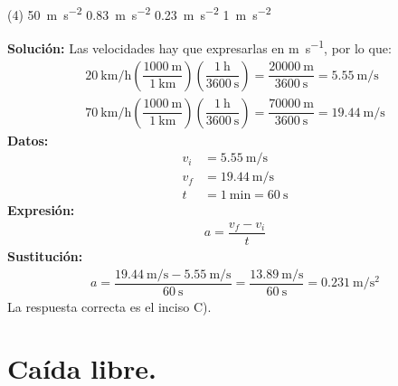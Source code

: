\documentclass[12pt, letter]{exam}
\begin{document}
\begin{questions}
    \begin{tasks}(4)
        \task \SI{50}{\meter\per\square\second}
        \task \SI{0.83}{\meter\per\square\second}
        \task \SI{0.23}{\meter\per\square\second}
        \task \SI{1}{\meter\per\square\second}
    \end{tasks}
    \textbf{Solución:} Las velocidades hay que expresarlas en \unit{\meter\per\second}, por lo que:
    \begin{align*}
    \SI[per-mode=fraction]{20}{\kilo\meter\per\hour} \left( \dfrac{\SI{1000}{\meter}}{\SI{1}{\kilo\meter}} \right) \left( \dfrac{\SI{1}{\hour}}{\SI{3600}{\second}} \right) = \dfrac{\SI{20000}{\meter}}{\SI{3600}{\second}} = \SI[per-mode=fraction]{5.55}{\meter\per\second} \\[0.5em]
    \SI[per-mode=fraction]{70}{\kilo\meter\per\hour} \left( \dfrac{\SI{1000}{\meter}}{\SI{1}{\kilo\meter}} \right) \left( \dfrac{\SI{1}{\hour}}{\SI{3600}{\second}} \right) = \dfrac{\SI{70000}{\meter}}{\SI{3600}{\second}} = \SI[per-mode=fraction]{19.44}{\meter\per\second}
    \end{align*}
    \textbf{Datos:}
    \begin{align*}
    v_{i} &= \SI[per-mode=fraction]{5.55}{\meter\per\second} \\[0.5em]
    v_{f} &= \SI[per-mode=fraction]{19.44}{\meter\per\second} \\[0.5em]
    t &= \SI{1}{\minute} = \SI{60}{\second}
    \end{align*}
    \textbf{Expresión:}
    \begin{align*}
    a = \dfrac{v_{f} - v_{i}}{t}
    \end{align*}
    \textbf{Sustitución:}
    \begin{align*}
    a = \dfrac{\displaystyle \SI[per-mode=fraction]{19.44}{\meter\per\second} - \SI[per-mode=fraction]{5.55}{\meter\per\second}}{\SI{60}{\second}} = \dfrac{\displaystyle \SI[per-mode=fraction]{13.89}{\meter\per\second}}{\SI{60}{\second}} = \SI[per-mode=fraction]{0.231}{\meter\per\square\second}
    \end{align*}
    La respuesta correcta es el inciso C).

    \section{Caída libre.}
    

\end{questions}
\end{document}
